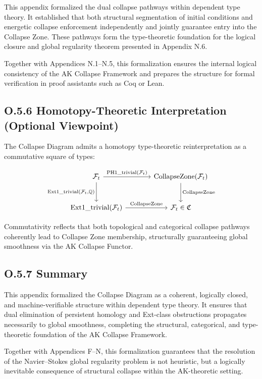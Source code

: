 \documentclass[11pt]{article}
\begin{document}
This appendix formalized the dual collapse pathways within dependent type theory.  
It established that both structural segmentation of initial conditions and energetic collapse enforcement independently and jointly guarantee entry into the Collapse Zone.  
These pathways form the type-theoretic foundation for the logical closure and global regularity theorem presented in Appendix N.6.

Together with Appendices N.1–N.5, this formalization ensures the internal logical consistency of the AK Collapse Framework and prepares the structure for formal verification in proof assistants such as Coq or Lean.


\subsection*{O.5.6 Homotopy-Theoretic Interpretation (Optional Viewpoint)}

The Collapse Diagram admits a homotopy type-theoretic reinterpretation as a commutative square of types:

\[
\begin{tikzcd}[row sep=large, column sep=large]
\mathcal{F}_t
  \arrow[r, "{\mathrm{PH1\_trivial}(\mathcal{F}_t)}"]
  \arrow[d, "{\mathrm{Ext1\_trivial}(\mathcal{F}_t, \mathbb{Q})}"']
& \mathrm{CollapseZone}(\mathcal{F}_t)
  \arrow[d, "{\mathrm{CollapseZone}}"] \\
\mathrm{Ext1\_trivial}(\mathcal{F}_t)
  \arrow[r, "{\mathrm{CollapseZone}}"]
& \mathcal{F}_t \in \mathfrak{C}
\end{tikzcd}
\]



Commutativity reflects that both topological and categorical collapse pathways coherently lead to Collapse Zone membership, structurally guaranteeing global smoothness via the AK Collapse Functor.

\subsection*{O.5.7 Summary}

This appendix formalized the Collapse Diagram as a coherent, logically closed, and machine-verifiable structure within dependent type theory.  
It ensures that dual elimination of persistent homology and Ext-class obstructions propagates necessarily to global smoothness, completing the structural, categorical, and type-theoretic foundation of the AK Collapse Framework.

Together with Appendices F–N, this formalization guarantees that the resolution of the Navier–Stokes global regularity problem is not heuristic, but a logically inevitable consequence of structural collapse within the AK-theoretic setting.
\end{document}
